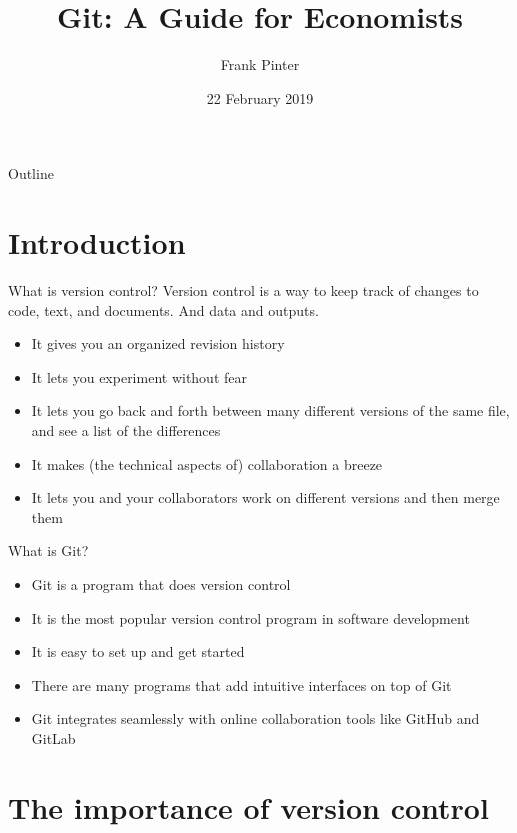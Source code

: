 \documentclass{beamer}
\title[Git for Economists]{Git: A Guide for Economists}
\author{Frank Pinter}
\date{22 February 2019}
\begin{document}
\begin{frame}
  \titlepage
\end{frame}

\begin{frame}{Outline}
  \tableofcontents
\end{frame}

\section*{Introduction}

\begin{frame}{What is version control?}
Version control is a way to keep track of changes to code, text, and documents. And data and outputs.
\begin{itemize}
\item It gives you an organized revision history
\item It lets you experiment without fear
\item It lets you go back and forth between many different versions of the same file, and see a list of the differences
\item It makes (the technical aspects of) collaboration a breeze
\item It lets you and your collaborators work on different versions and then merge them
\end{itemize}
\end{frame}

\begin{frame}{What is Git?}
\begin{itemize}
\item Git is a program that does version control
\item It is the most popular version control program in software development
\item It is easy to set up and get started
\item There are many programs that add intuitive interfaces on top of Git
\item Git integrates seamlessly with online collaboration tools like GitHub and GitLab
\end{itemize}
\end{frame}

\section{The importance of version control}
\end{document}
